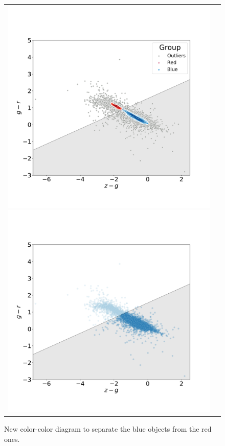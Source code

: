 \documentclass[fleqn,usenatbib]{mnras}
\begin{document}
\begin{figure}
\centering
\begin{tabular}{l l}
  \includegraphics[width=0.5\linewidth, trim=10 10 5 8, clip]{Figs/blued-red-hdbscan.pdf}
   \includegraphics[width=0.5\linewidth, trim=10 10 5 8. clip]{Figs/blued-red-hdbscan-soft.pdf}
  \end{tabular}  
  \caption{New color-color diagram to separate the blue objects from the red ones.}
\label{fig:hdbscan}
\end{figure}
\end{document}
